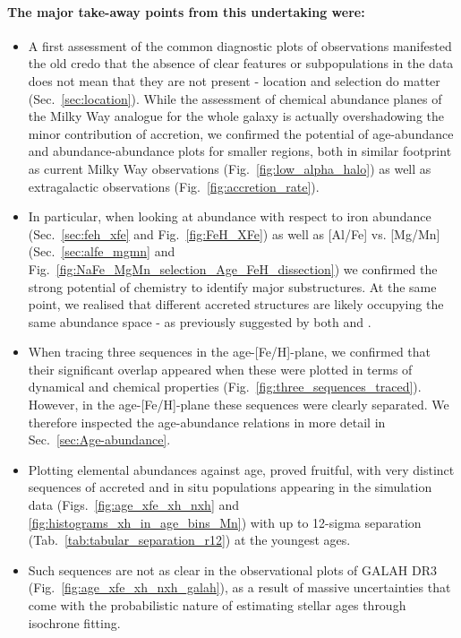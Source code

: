 \documentclass[fleqn,usenatbib]{mnras}
\begin{document}
\paragraph*{The major take-away points from this undertaking were:}
\begin{itemize}
    \item A first assessment of the common diagnostic plots of observations manifested the old credo that the absence of clear features or subpopulations in the data does not mean that they are not present - location and selection do matter (Sec.~\ref{sec:location}). While the assessment of chemical abundance planes of the Milky Way analogue for the whole galaxy is actually overshadowing the minor contribution of accretion, we confirmed the potential of age-abundance and abundance-abundance plots for smaller regions, both in similar footprint as current Milky Way observations (Fig.~\ref{fig:low_alpha_halo}) as well as extragalactic observations (Fig.~\ref{fig:accretion_rate}).
    \item In particular, when looking at abundance with respect to iron abundance (Sec.~\ref{sec:feh_xfe} and Fig.~\ref{fig:FeH_XFe}) as well as [Al/Fe] vs. [Mg/Mn] (Sec.~\ref{sec:alfe_mgmn} and Fig.~\ref{fig:NaFe_MgMn_selection_Age_FeH_dissection}) we confirmed the strong potential of chemistry to identify major substructures. At the same point, we realised that different accreted structures are likely occupying the same abundance space - as previously suggested by both \citet{Horta2021} and \citet{Rey2023}.
    \item When tracing three sequences in the age-[Fe/H]-plane, we confirmed that their significant overlap appeared when these were plotted in terms of dynamical and chemical properties (Fig.~\ref{fig:three_sequences_traced}). However, in the age-[Fe/H]-plane these sequences were clearly separated. We therefore inspected the age-abundance relations in more detail in Sec.~\ref{sec:Age-abundance}. 
    \item Plotting elemental abundances against age, proved fruitful, with very distinct sequences of accreted and in situ populations appearing in the simulation data (Figs.~\ref{fig:age_xfe_xh_nxh} and \ref{fig:histograms_xh_in_age_bins_Mn}) with up to 12-sigma separation (Tab.~\ref{tab:tabular_separation_r12}) at the youngest ages.
    \item Such sequences are not as clear in the observational plots of GALAH DR3 (Fig.~\ref{fig:age_xfe_xh_nxh_galah}), as a result of massive uncertainties that come with the probabilistic nature of estimating stellar ages through isochrone fitting.

\end{itemize}
\end{document}
